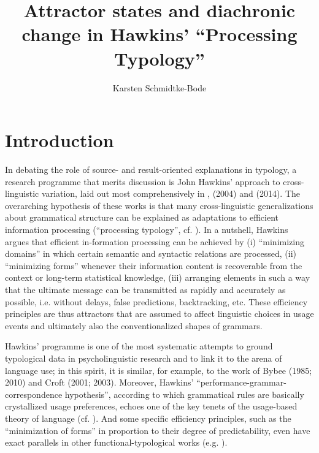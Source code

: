\documentclass[output=paper]{langsci/langscibook}
\author{Karsten Schmidtke-Bode\affiliation{Leipzig University}}
\title{Attractor states and diachronic change in Hawkins’ “Processing Typology”}
\begin{document}
\maketitle 
 
\section{ Introduction} 

In debating the role of source- and result-oriented explanations in typology, a research programme that merits discussion is John Hawkins’ approach to cross-linguistic variation, laid out most comprehensively in \citet{Hawkins1994}, (2004) and (2014). The overarching hypothesis of these works is that many cross-linguistic generalizations about grammatical structure can be explained as adaptations to efficient information processing (“processing typology”, cf. \citealt{Hawkins2007}). In a nutshell, Hawkins argues that efficient in-formation processing can be achieved by (i) “minimizing domains” in which certain semantic and syntactic relations are processed, (ii) “minimizing forms” whenever their information content is recoverable from the context or long-term statistical knowledge, (iii) arranging elements in such a way that the ultimate message can be transmitted as rapidly and accurately as possible, i.e. without delays, false predictions, backtracking, etc. These efficiency principles are thus attractors that are assumed to affect linguistic choices in usage events and ultimately also the conventionalized shapes of grammars.

Hawkins’ programme is one of the most systematic attempts to ground typological data in psycholinguistic research and to link it to the arena of language use; in this spirit, it is similar, for example, to the work of Bybee (1985; 2010) and Croft (2001; 2003). Moreover, Hawkins’ “performance-grammar-correspondence hypothesis”, according to which grammatical rules are basically crystallized usage preferences, echoes one of the key tenets of the usage-based theory of language (cf. \citealt{Langacker1987,KemmerBarlow2000}). And some specific efficiency principles, such as the “minimization of forms” in proportion to their degree of predictability, even have exact parallels in other functional-typological works (e.g. \citealt{Haiman1983,Croft2003,Haspelmath2008}). 
\end{document}
